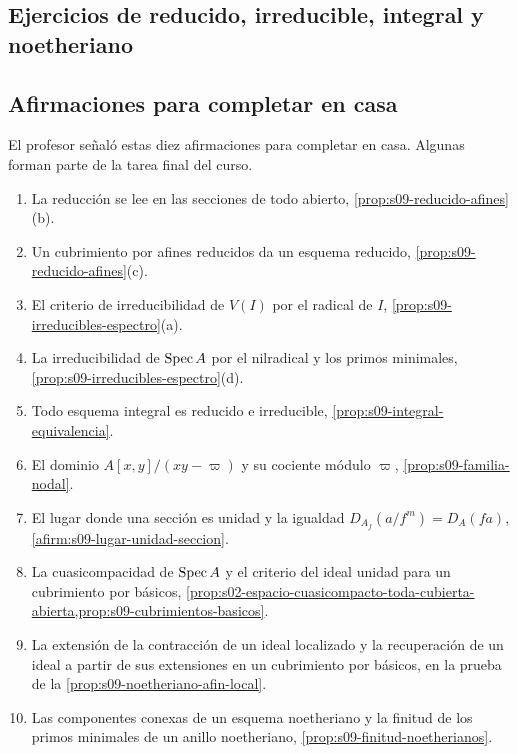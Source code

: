 \begin{samepage}
\section{Ejercicios de reducido, irreducible, integral y noetheriano}

\subsection*{Afirmaciones para completar en casa}

El profesor señaló estas diez afirmaciones para completar en casa. Algunas forman parte de la tarea final del curso.
\begin{enumerate}
\item La reducción se lee en las secciones de todo abierto, \cref{prop:s09-reducido-afines}(b).
\item Un cubrimiento por afines reducidos da un esquema reducido, \cref{prop:s09-reducido-afines}(c).
\item El criterio de irreducibilidad de $V(I)$ por el radical de $I$, \cref{prop:s09-irreducibles-espectro}(a).
\item La irreducibilidad de $\operatorname{Spec} A$ por el nilradical y los primos minimales, \cref{prop:s09-irreducibles-espectro}(d).
\item Todo esquema integral es reducido e irreducible, \cref{prop:s09-integral-equivalencia}.
\item El dominio $A[x,y]/(xy-\varpi)$ y su cociente módulo $\varpi$, \cref{prop:s09-familia-nodal}.
\item El lugar donde una sección es unidad y la igualdad $D_{A_f}(a/f^m)=D_A(fa)$, \cref{afirm:s09-lugar-unidad-seccion}.
\item La cuasicompacidad de $\operatorname{Spec} A$ y el criterio del ideal unidad para un cubrimiento por básicos, \cref{prop:s02-espacio-cuasicompacto-toda-cubierta-abierta,prop:s09-cubrimientos-basicos}.
\item La extensión de la contracción de un ideal localizado y la recuperación de un ideal a partir de sus extensiones en un cubrimiento por básicos, en la prueba de la \cref{prop:s09-noetheriano-afin-local}.
\item Las componentes conexas de un esquema noetheriano y la finitud de los primos minimales de un anillo noetheriano, \cref{prop:s09-finitud-noetherianos}.
\end{enumerate}
\end{samepage}

